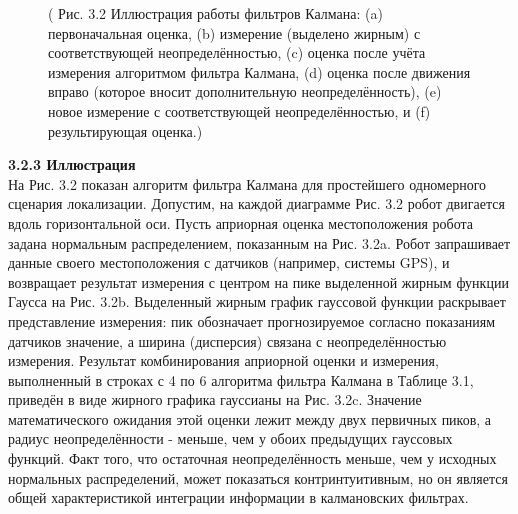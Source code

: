 \documentclass[10pt,a4paper]{article}
\begin{document}
\begin{figure}[h]
	\caption{ (  Рис. 3.2 Иллюстрация работы фильтров Калмана: (a) первоначальная оценка, (b) измерение (выделено жирным) с соответствующей неопределённостью, (c) оценка после учёта измерения алгоритмом фильтра Калмана, (d) оценка после движения вправо (которое вносит дополнительную неопределённость), (e) новое измерение с соответствующей неопределённостью, и (f) результирующая оценка.)}
	\label{fig:32orig}
\end{figure}

\textbf{3.2.3 Иллюстрация}\\

На Рис. 3.2 показан алгоритм фильтра Калмана для простейшего одномерного сценария локализации. Допустим, на каждой диаграмме Рис. 3.2 робот двигается вдоль горизонтальной оси. Пусть априорная оценка местоположения робота задана нормальным распределением, показанным на Рис. 3.2a. Робот запрашивает данные своего местоположения с датчиков (например, системы GPS), и возвращает результат измерения с центром на пике выделенной жирным  функции Гаусса на Рис. 3.2b. Выделенный жирным график гауссовой функции раскрывает представление измерения: пик обозначает прогнозируемое согласно показаниям датчиков значение, а ширина (дисперсия) связана с неопределённостью измерения. Результат комбинирования априорной оценки и измерения, выполненный в строках с 4 по 6 алгоритма фильтра Калмана в Таблице 3.1, приведён в виде  жирного графика гауссианы на Рис. 3.2c. Значение математического ожидания этой оценки лежит между двух первичных пиков, а радиус неопределённости - меньше, чем у обоих предыдущих гауссовых функций. Факт того, что остаточная неопределённость меньше, чем у исходных нормальных распределений, может показаться контринтуитивным, но он является общей характеристикой интеграции информации в калмановских фильтрах.
\end{document}
